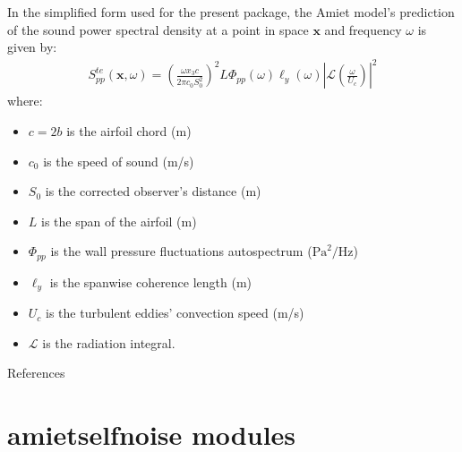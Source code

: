 \documentclass[letterpaper,10pt,english]{sphinxmanual}
\begin{document}
\sphinxAtStartPar
In the simplified form used for the present package, the Amiet model’s prediction of the sound power spectral density at a point in space \(\mathbf{x}\) and frequency \(\omega\) is given by:
\begin{equation}\label{equation:theory:amiet-model}
\begin{split}S_{pp}^{te}(\mathbf{x},\omega) = \left(\frac{\omega x_3 c}{2\pi c_0 S_0^2}\right)^2 L\Phi_{pp}(\omega)\ell_y\left(\omega\right)\left\vert\mathcal L\left(\frac{\omega}{U_c}\right)\right\vert^2\end{split}
\end{equation}
\sphinxAtStartPar
where:
\begin{itemize}
\item {} 
\sphinxAtStartPar
\(c = 2b\) is the airfoil chord (m)

\item {} 
\sphinxAtStartPar
\(c_0\) is the speed of sound (m/s)

\item {} 
\sphinxAtStartPar
\(S_0\) is the corrected observer’s distance (m)

\item {} 
\sphinxAtStartPar
\(L\) is the span of the airfoil (m)

\item {} 
\sphinxAtStartPar
\(\Phi_{pp}\) is the wall pressure fluctuations autospectrum (\(\mathrm{Pa}^2/\mathrm{Hz}\))

\item {} 
\sphinxAtStartPar
\(\ell_y\) is the span\sphinxhyphen{}wise coherence length (m)

\item {} 
\sphinxAtStartPar
\(U_c\) is the turbulent eddies’ convection speed (m/s)

\item {} 
\sphinxAtStartPar
\(\mathcal{L}\) is the radiation integral.

\end{itemize}

\sphinxAtStartPar
References

\sphinxstepscope


\chapter{amiet\sphinxhyphen{}self\sphinxhyphen{}noise modules}
\label{\detokenize{modules:amiet-self-noise-modules}}\label{\detokenize{modules::doc}}
\sphinxstepscope
\end{document}
